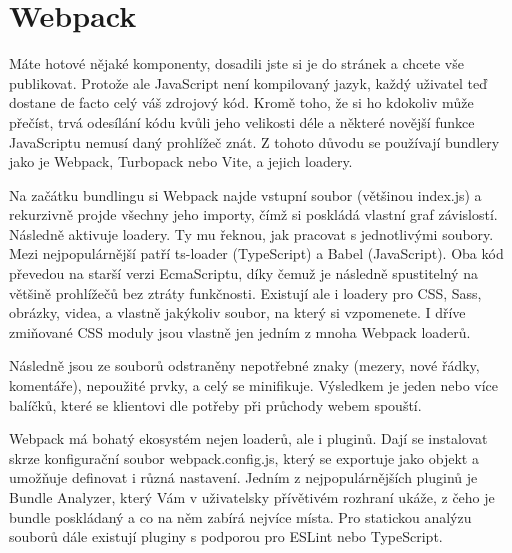 \section{Webpack}

Máte hotové nějaké komponenty, dosadili jste si je do stránek a chcete vše publikovat. Protože ale JavaScript není kompilovaný jazyk, každý uživatel teď dostane de facto celý váš zdrojový kód. Kromě toho, že si ho kdokoliv může přečíst, trvá odesílání kódu kvůli jeho velikosti déle a některé novější funkce JavaScriptu nemusí daný prohlížeč znát. Z tohoto důvodu se používají bundlery jako je Webpack\cite{Webpack}\cite{WebpackFireship}, Turbopack nebo Vite, a jejich loadery.

Na začátku bundlingu si Webpack najde vstupní soubor (většinou index.js) a rekurzivně projde všechny jeho importy\cite{WebpackConcepts}\cite{WebpackFounder}, čímž si poskládá vlastní graf závislostí\cite{WebpackDependency}. Následně aktivuje loadery. Ty mu řeknou, jak pracovat s jednotlivými soubory. Mezi nejpopulárnější patří ts-loader (TypeScript) a Babel (JavaScript). Oba kód převedou na starší verzi EcmaScriptu, díky čemuž je následně spustitelný na většině prohlížečů bez ztráty funkčnosti. Existují ale i loadery pro CSS, Sass, obrázky, videa, a vlastně jakýkoliv soubor, na který si vzpomenete. I dříve zmiňované CSS moduly jsou vlastně jen jedním z mnoha Webpack loaderů.

Následně jsou ze souborů odstraněny nepotřebné znaky (mezery, nové řádky, komentáře), nepoužité prvky, a celý se minifikuje. Výsledkem je jeden nebo více balíčků, které se klientovi dle potřeby při průchody webem spouští.

Webpack má bohatý ekosystém nejen loaderů, ale i pluginů. Dají se instalovat skrze konfigurační soubor webpack.config.js, který se exportuje jako objekt a umožňuje definovat i různá nastavení. Jedním z nejpopulárnějších pluginů je Bundle Analyzer, který Vám v uživatelsky přívětivém rozhraní ukáže, z čeho je bundle poskládaný a co na něm zabírá nejvíce místa. Pro statickou analýzu souborů dále existují pluginy s podporou pro ESLint nebo TypeScript.